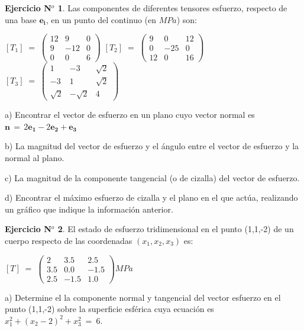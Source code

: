 \documentclass[12pt,a4paper]{article}
\theoremstyle{definition}
\newtheorem{theorem}{Ejercicio N$^o$}
\begin{document}
\begin{theorem}

Las componentes de diferentes tensores esfuerzo, respecto de una base $\mathbf{e_i}$, en un punto del continuo (en $MPa$) son:

$[T_1] \; = \;
\left(\begin{matrix}
12 & 9 & 0\\
9 & -12 & 0\\
0 & 0 & 6
\end{matrix}\right)
$
\hspace*{0.5cm}$[T_2] \; = \;
\left( \begin{matrix}
9 & 0 & 12 \\
0 & -25 & 0 \\
12 & 0 & 16 
\end{matrix} \right)
$
\hspace*{0.5cm} 
$[T_3] \; = \;
\left( \begin{matrix}
1 & -3 & \sqrt{2} \\
-3 & 1 & \sqrt{2} \\
\sqrt{2} & -\sqrt{2} & 4 
\end{matrix} \right)
$


\noindent a) Encontrar el vector de esfuerzo en un plano cuyo vector normal es \linebreak $\mathbf{n}\,=\, 2\mathbf{e_1}-2\mathbf{e_2}+\mathbf{e_3}$

\noindent b) La magnitud del vector de esfuerzo y el ángulo entre el vector de esfuerzo y la normal al plano.

\noindent c) La magnitud de la componente tangencial (o de cizalla) del vector de esfuerzo.

\noindent d) Encontrar el máximo esfuerzo de cizalla y el plano en el que actúa, realizando un gráfico que indique la información anterior.
\end{theorem}


\bigskip

\begin{theorem}
El estado de esfuerzo tridimensional en el punto (1,1,-2) de un cuerpo respecto de las coordenadas $(x_1,x_2,x_3)$ es:

\hspace*{4cm}$[T] \; = \;
\left( \begin{matrix}
2 & 3.5 & 2.5 \\
3.5 & 0.0 & -1.5 \\
2.5 & -1.5 & 1.0 
\end{matrix} \right) MPa
$


\medskip
a) Determine el la componente normal y tangencial del vector esfuerzo en el punto (1,1,-2) sobre la superficie esférica cuya ecuación es $x_1^2+(x_2-2)^2+x_3^2\:=\:6$.
\end{theorem}
\end{document}
